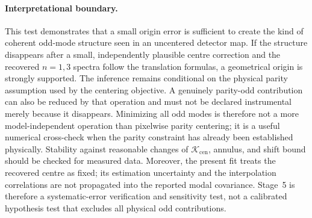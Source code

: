 \documentclass[aps,prb,preprint,onecolumn,notitlepage,amsmath,amssymb,
  superscriptaddress,floatfix]{revtex4-2}
\newcommand{\Modes}{\mathcal{K}}
\begin{document}
\paragraph{Interpretational boundary.}
This test demonstrates that a small origin error is sufficient to create the
kind of coherent odd-mode structure seen in an uncentered detector map.  If
the structure disappears after a small, independently plausible centre
correction and the recovered $n=1,3$ spectra follow the translation formulas,
a geometrical origin is strongly supported.  The inference remains
conditional on the physical parity assumption used by the centering
objective.  A genuinely parity-odd contribution can also be reduced by that
operation and must not be declared instrumental merely because it disappears.
Minimizing all odd modes is therefore not a more model-independent operation
than pixelwise parity centering; it is a useful numerical cross-check when
the parity constraint has already been established physically. Stability
against reasonable changes of $\Modes_{\mathrm{cen}}$, annulus, and shift
bound should be checked for measured data.
Moreover, the present fit treats the recovered centre as fixed; its estimation
uncertainty and the interpolation correlations are not propagated into the
reported modal covariance.  Stage~5 is therefore a systematic-error
verification and sensitivity test, not a calibrated hypothesis test that
excludes all physical odd contributions.
\end{document}
